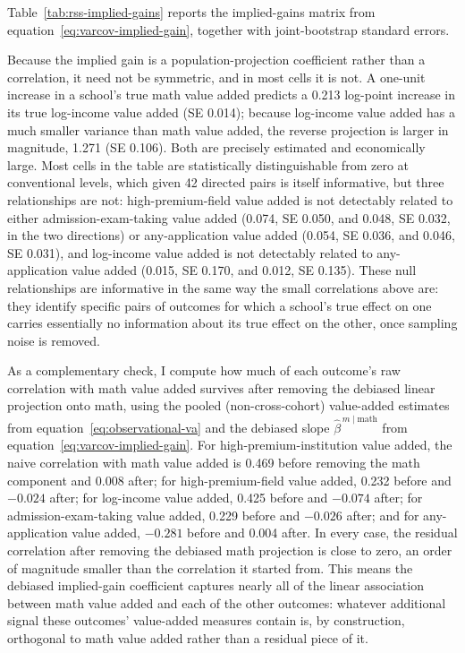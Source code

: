 \documentclass[a4paper, article, english, oneside, unknownkeysallowed, 12pt]{memoir}
\begin{document}
Table~\ref{tab:rss-implied-gains} reports the implied-gains matrix from equation~\eqref{eq:varcov-implied-gain}, together with joint-bootstrap standard errors.



Because the implied gain is a population-projection coefficient rather than a correlation, it need not be symmetric, and in most cells it is not.
A one-unit increase in a school's true math value added predicts a 0.213 log-point increase in its true log-income value added (SE 0.014); because log-income value added has a much smaller variance than math value added, the reverse projection is larger in magnitude, 1.271 (SE 0.106).
Both are precisely estimated and economically large.
Most cells in the table are statistically distinguishable from zero at conventional levels, which given 42 directed pairs is itself informative, but three relationships are not: high-premium-field value added is not detectably related to either admission-exam-taking value added (0.074, SE 0.050, and 0.048, SE 0.032, in the two directions) or any-application value added (0.054, SE 0.036, and 0.046, SE 0.031), and log-income value added is not detectably related to any-application value added (0.015, SE 0.170, and 0.012, SE 0.135).
These null relationships are informative in the same way the small correlations above are: they identify specific pairs of outcomes for which a school's true effect on one carries essentially no information about its true effect on the other, once sampling noise is removed.

As a complementary check, I compute how much of each outcome's raw correlation with math value added survives after removing the debiased linear projection onto math, using the pooled (non-cross-cohort) value-added estimates from equation~\eqref{eq:observational-va} and the debiased slope $\widehat\beta^{\,m\mid \text{math}}$ from equation~\eqref{eq:varcov-implied-gain}.
For high-premium-institution value added, the naive correlation with math value added is 0.469 before removing the math component and 0.008 after; for high-premium-field value added, 0.232 before and $-0.024$ after; for log-income value added, 0.425 before and $-0.074$ after; for admission-exam-taking value added, 0.229 before and $-0.026$ after; and for any-application value added, $-0.281$ before and 0.004 after.
In every case, the residual correlation after removing the debiased math projection is close to zero, an order of magnitude smaller than the correlation it started from.
This means the debiased implied-gain coefficient captures nearly all of the linear association between math value added and each of the other outcomes: whatever additional signal these outcomes' value-added measures contain is, by construction, orthogonal to math value added rather than a residual piece of it.
\end{document}
